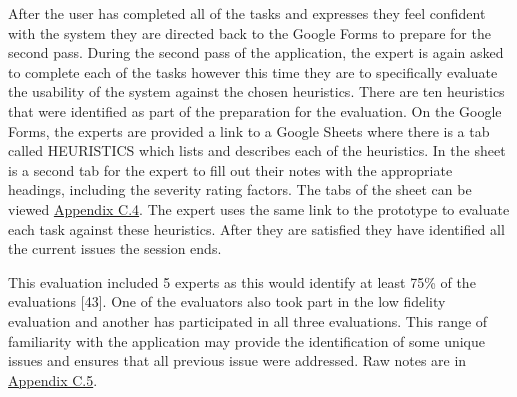 \documentclass[a4 paper, 12pt]{article}
\begin{document}
    After the user has completed all of the tasks and expresses they feel confident with the system they are directed back to the Google Forms to prepare for the second pass. During the second pass of the application, the expert is again asked to complete each of the tasks however this time they are to specifically evaluate the usability of the system against the chosen heuristics. There are ten heuristics that were identified as part of the preparation for the evaluation. On the Google Forms, the experts are provided a link to a Google Sheets where there is a tab called HEURISTICS which lists and describes each of the heuristics. In the sheet is a second tab for the expert to fill out their notes with the appropriate headings, including the severity rating factors. The tabs of the sheet can be viewed \hyperref[sec:C.4]{Appendix C.4}. The expert uses the same link to the prototype to evaluate each task against these heuristics. After they are satisfied they have identified all the current issues the session ends.
    
    This evaluation included 5 experts as this would identify at least 75\% of the evaluations [43]. One of the evaluators also took part in the low fidelity evaluation and another has participated in all three evaluations. This range of familiarity with the application may provide the identification of some unique issues and ensures that all previous issue were addressed. Raw notes are in \hyperref[sec:C.5]{Appendix C.5}. 
\end{document}
